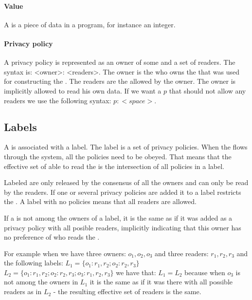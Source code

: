\paragraph{Value}
A \xvalue{} is a piece of data in a program, for instance an integer.

\paragraph{Privacy policy}
A privacy policy is represented as an owner of some \xvalue{} and a set of readers.
The syntax is: <owner>: <readers>.
The owner is the \principal{} who owns the \xvalue{} that was used for constructing the \xvalue{}.
The readers are the \principals{} allowed by the owner.
The owner is implicitly allowed to read his own data.
If we want a \principal{} $p$ that should not allow any readers we use the following syntax: $p: <space> $.

\subsection{Labels}
A \xvalue{} is associated with a label.
The label is a set of privacy policies.
When the \xvalue{} flows through the system, all the policies need to be obeyed.
That means that the effective set of \principals{} able to read the \xvalue{} is the intersection of all policies in a label.


Labeled \xvalues{} are only released by the consensus of all the owners and can only be read by the readers.
If one or several privacy policies are added it to a label restricts the \xvalue{}.
A label with no policies  means that all readers are allowed.

If a \principal{} is not among the owners of a label, it is the same as if it was added as a privacy policy with all posible readers, implicitly indicating that this owner has no preference of who reads the \xvalue{}.


For example when we have three owners: $o_1, o_2, o_3$ and three readers: $r_1, r_2, r_3$ and the following labels:
$L_1 = \{o_1: r_1,r_2; o_2: r_2, r_3\}$
$L_2 = \{o_1: r_1,r_2; o_2: r_2, r_3; o_3: r_1, r_2, r_3\}$
we have that: $L_1 = L_2$ because when $o_3$ is not among the owners in $L_1$ it is the same as if it was there with all possible readers as in $L_2$ - the resulting effective set of readers is the same.

